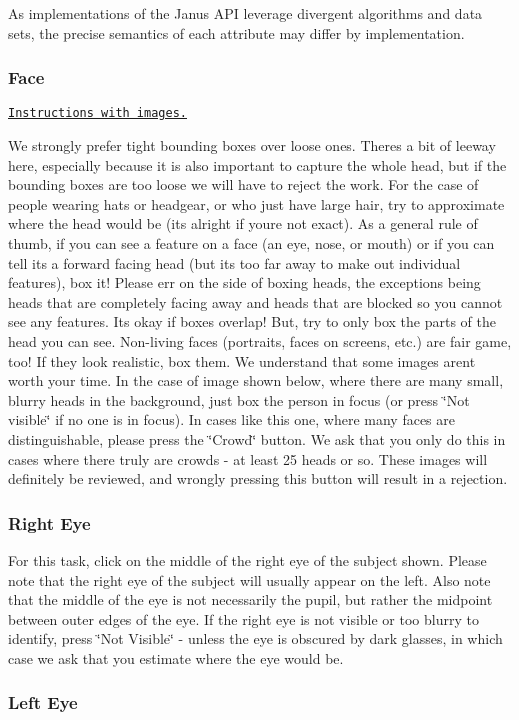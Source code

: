 As implementations of the Janus A\+P\+I leverage divergent algorithms and data sets, the precise semantics of each attribute may differ by implementation.\hypertarget{group__janus_face}{}\subsubsection{Face}\label{group__janus_face}
\href{https://s3.amazonaws.com/TurkAnnotator/boundingboxesinstructions.html}{\tt Instructions with images.}

We strongly prefer tight bounding boxes over loose ones. There\textquotesingle{}s a bit of leeway here, especially because it is also important to capture the whole head, but if the bounding boxes are too loose we will have to reject the work. For the case of people wearing hats or headgear, or who just have large hair, try to approximate where the head would be (it\textquotesingle{}s alright if you\textquotesingle{}re not exact). As a general rule of thumb, if you can see a feature on a face (an eye, nose, or mouth) or if you can tell it\textquotesingle{}s a forward facing head (but it\textquotesingle{}s too far away to make out individual features), box it! Please err on the side of boxing heads, the exceptions being heads that are completely facing away and heads that are blocked so you cannot see any features. It\textquotesingle{}s okay if boxes overlap! But, try to only box the parts of the head you can see. Non-\/living faces (portraits, faces on screens, etc.) are fair game, too! If they look realistic, box them. We understand that some images aren\textquotesingle{}t worth your time. In the case of image shown below, where there are many small, blurry heads in the background, just box the person in focus (or press \char`\"{}\+Not visible\char`\"{} if no one is in focus). In cases like this one, where many faces are distinguishable, please press the \char`\"{}\+Crowd\char`\"{} button. We ask that you only do this in cases where there truly are crowds -\/ at least 25 heads or so. These images will definitely be reviewed, and wrongly pressing this button will result in a rejection.\hypertarget{group__janus_right_eye}{}\subsubsection{Right Eye}\label{group__janus_right_eye}
For this task, click on the middle of the right eye of the subject shown. Please note that the right eye of the subject will usually appear on the left. Also note that the middle of the eye is not necessarily the pupil, but rather the midpoint between outer edges of the eye. If the right eye is not visible or too blurry to identify, press \char`\"{}\+Not Visible\char`\"{} -\/ unless the eye is obscured by dark glasses, in which case we ask that you estimate where the eye would be.\hypertarget{group__janus_left_eye}{}\subsubsection{Left Eye}\label{group__janus_left_eye}
